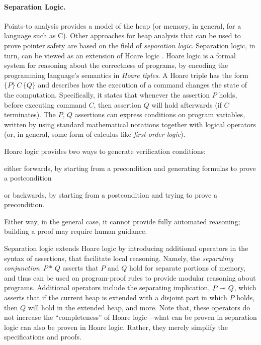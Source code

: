 \paragraph{Separation Logic.}
Points-to analysis provides a model of the heap (or memory, in
general, for a language such as C). Other approaches for heap analysis
that can be used to prove pointer safety are based on the field of
\emph{separation logic}. Separation logic, in turn, can be viewed as
an extension of Hoare logic
\cite{journals/cacm/Hoare69,floyd1967assigning,lics:2002/Reynolds,csl/OHearnRY01}.
Hoare logic is a formal system for reasoning about the correctness of
programs, by encoding the programming language's semantics in
\emph{Hoare tiples}. A Hoare triple has the form \(\{P\}\, C\, \{Q\}\)
and describes how the execution of a command changes the state of the
computation. Specifically, it states that whenever the assertion \(P\)
holds, before executing command \(C\), then assertion \(Q\) will hold
afterwards (if \(C\) terminates). The \(P,\, Q\) assertions can
express conditions on program variables, written by using standard
mathematical notations together with logical operators (or, in
general, some form of calculus like \emph{first-order logic}).

Hoare logic provides two ways to generate verification conditions:
\begin{inparaenum}[(i)]
\item either forwards, by starting from a precondition and
  generating formulas to prove a postcondition
\item or backwards, by starting from a postcondition and trying to
  prove a precondition.
\end{inparaenum}
Either way, in the general case, it cannot provide fully automated
reasoning; building a proof may require human guidance.


Separation logic
\cite{lics:2002/Reynolds,csl/OHearnRY01,popl/IshtiaqO01,Reynolds00intuitionisticreasoning}
extends Hoare logic by introducing additional operators in the syntax
of assertions, that facilitate local reasoning. Namely, the
\emph{separating conjunction} \(\,P * \,Q\) asserts that \(P\) and
\(Q\) hold for separate portions of memory, and thus can be used on
program-proof rules to provide modular reasoning about
programs. Additional operators include the separating implication,
\(P \sep Q\), which asserts that if the current heap is extended with
a disjoint part in which \(P\) holds, then \(Q\) will hold in the
extended heap, and more. Note that, these operators do not increase
the ``completeness'' of Hoare logic---what can be proven in separation
logic can also be proven in Hoare logic. Rather, they merely simplify
the specifications and proofs.

